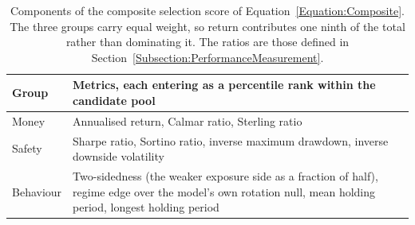 \begin{table}[htb!]
\centering
\footnotesize
\begin{tabularx}{\textwidth}{@{}lX@{}}
\toprule
\textbf{Group} & \textbf{Metrics, each entering as a percentile rank within the candidate pool} \\
\midrule
Money & Annualised return, Calmar ratio, Sterling ratio \\
\addlinespace
Safety & Sharpe ratio, Sortino ratio, inverse maximum drawdown, inverse downside volatility \\
\addlinespace
Behaviour & Two-sidedness (the weaker exposure side as a fraction of half), regime edge over the model's own rotation null, mean holding period, longest holding period \\
\bottomrule
\end{tabularx}
\caption{Components of the composite selection score of Equation~\ref{Equation:Composite}. The three groups carry equal weight, so return contributes one ninth of the total rather than dominating it. The ratios are those defined in Section~\ref{Subsection:PerformanceMeasurement}.}
\label{Tables:Composite}
\end{table}